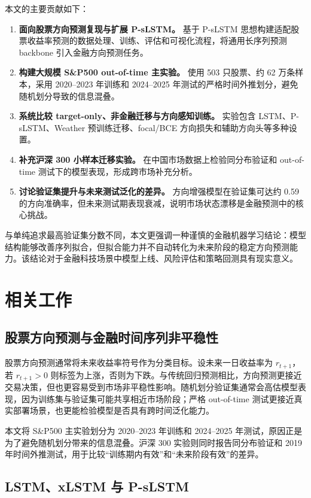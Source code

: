 \documentclass[UTF8,zihao=-4,twocolumn,fontset=fandol]{ctexart}
\begin{document}
本文的主要贡献如下：

\begin{enumerate}
  \item \textbf{面向股票方向预测复现与扩展 P-sLSTM。} 基于 P-sLSTM 思想构建适配股票收益率预测的数据处理、训练、评估和可视化流程，将通用长序列预测 backbone 引入金融方向预测任务。
  \item \textbf{构建大规模 S\&P500 out-of-time 主实验。} 使用 503 只股票、约 62 万条样本，采用 2020--2023 年训练和 2024--2025 年测试的严格时间外推划分，避免随机划分导致的信息混叠。
  \item \textbf{系统比较 target-only、非金融迁移与方向感知训练。} 实验包含 LSTM、P-sLSTM、Weather 预训练迁移、focal/BCE 方向损失和辅助方向头等多种设置。
  \item \textbf{补充沪深 300 小样本迁移实验。} 在中国市场数据上检验同分布验证和 out-of-time 测试下的模型表现，形成跨市场补充分析。
  \item \textbf{讨论验证集提升与未来测试泛化的差异。} 方向增强模型在验证集可达约 0.59 的方向准确率，但未来测试期表现衰减，说明市场状态漂移是金融预测中的核心挑战。
\end{enumerate}

与单纯追求最高验证集分数不同，本文更强调一种谨慎的金融机器学习结论：模型结构能够改善序列拟合，但拟合能力并不自动转化为未来阶段的稳定方向预测能力。该结论对于金融科技场景中模型上线、风险评估和策略回测具有现实意义。

\section{相关工作}

\subsection{股票方向预测与金融时间序列非平稳性}

股票方向预测通常将未来收益率符号作为分类目标。设未来一日收益率为 $r_{t+1}$，若 $r_{t+1}>0$ 则标签为上涨，否则为下跌。与传统回归预测相比，方向预测更接近交易决策，但也更容易受到市场非平稳性影响。随机划分验证集通常会高估模型表现，因为训练集与验证集可能共享相近市场阶段；严格 out-of-time 测试更接近真实部署场景，也更能检验模型是否具有跨时间泛化能力。

本文将 S\&P500 主实验划分为 2020--2023 年训练和 2024--2025 年测试，原因正是为了避免随机划分带来的信息混叠。沪深 300 实验则同时报告同分布验证和 2019 年时间外推测试，用于比较“训练期内有效”和“未来阶段有效”的差异。

\subsection{LSTM、xLSTM 与 P-sLSTM}
\end{document}
